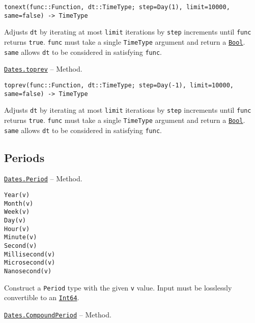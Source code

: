 \begin{adjustwidth}{2em}{0pt}


\begin{verbatim}
tonext(func::Function, dt::TimeType; step=Day(1), limit=10000, same=false) -> TimeType
\end{verbatim}

Adjusts \texttt{dt} by iterating at most \texttt{limit} iterations by \texttt{step} increments until \texttt{func} returns \texttt{true}. \texttt{func} must take a single \texttt{TimeType} argument and return a \hyperlink{46725311238864537}{\texttt{Bool}}. \texttt{same} allows \texttt{dt} to be considered in satisfying \texttt{func}.



\end{adjustwidth}
\hypertarget{7889720794479911439}{} 
\hyperlink{7889720794479911439}{\texttt{Dates.toprev}}  -- {Method.}

\begin{adjustwidth}{2em}{0pt}


\begin{verbatim}
toprev(func::Function, dt::TimeType; step=Day(-1), limit=10000, same=false) -> TimeType
\end{verbatim}

Adjusts \texttt{dt} by iterating at most \texttt{limit} iterations by \texttt{step} increments until \texttt{func} returns \texttt{true}. \texttt{func} must take a single \texttt{TimeType} argument and return a \hyperlink{46725311238864537}{\texttt{Bool}}. \texttt{same} allows \texttt{dt} to be considered in satisfying \texttt{func}.



\end{adjustwidth}

\hypertarget{5161625535326415321}{}


\subsection{Periods}


\hypertarget{5339072836021258931}{} 
\hyperlink{5339072836021258931}{\texttt{Dates.Period}}  -- {Method.}

\begin{adjustwidth}{2em}{0pt}


\begin{verbatim}
Year(v)
Month(v)
Week(v)
Day(v)
Hour(v)
Minute(v)
Second(v)
Millisecond(v)
Microsecond(v)
Nanosecond(v)
\end{verbatim}

Construct a \texttt{Period} type with the given \texttt{v} value. Input must be losslessly convertible to an \hyperlink{7720564657383125058}{\texttt{Int64}}.



\end{adjustwidth}
\hypertarget{11754777390580731638}{} 
\hyperlink{11754777390580731638}{\texttt{Dates.CompoundPeriod}}  -- {Method.}

